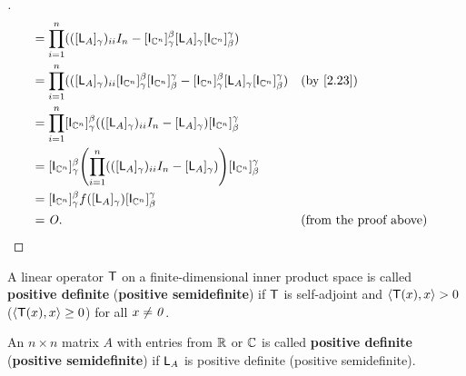 \begin{proof}[]
\begin{align*}
         & = \prod_{i = 1}^n (([\L_A]_{\gamma})_{i i} I_n - [\IT[\C^n]]_{\gamma}^{\beta} [\L_A]_{\gamma} [\IT[\C^n]]_{\beta}^{\gamma})                                                                                          \\
         & = \prod_{i = 1}^n (([\L_A]_{\gamma})_{i i} [\IT[\C^n]]_{\gamma}^{\beta} [\IT[\C^n]]_{\beta}^{\gamma} - [\IT[\C^n]]_{\gamma}^{\beta} [\L_A]_{\gamma} [\IT[\C^n]]_{\beta}^{\gamma}) &  & \text{(by \cref{2.23})}       \\
         & = \prod_{i = 1}^n [\IT[\C^n]]_{\gamma}^{\beta} (([\L_A]_{\gamma})_{i i} I_n - [\L_A]_{\gamma}) [\IT[\C^n]]_{\beta}^{\gamma}                                                                                          \\
         & = [\IT[\C^n]]_{\gamma}^{\beta} \pa{\prod_{i = 1}^n (([\L_A]_{\gamma})_{i i} I_n - [\L_A]_{\gamma})} [\IT[\C^n]]_{\beta}^{\gamma}                                                                                     \\
         & = [\IT[\C^n]]_{\gamma}^{\beta} f([\L_A]_{\gamma}) [\IT[\C^n]]_{\beta}^{\gamma}                                                                                                                                       \\
         & = \zm.                                                                                                                                                                            &  & \text{(from the proof above)}
  \end{align*}
\end{proof}

\begin{defn}\label{6.4.11}
  A linear operator \(\mathsf{T}\) on a finite-dimensional inner product space is called \textbf{positive definite} (\textbf{positive semidefinite}) if \(\mathsf{T}\) is self-adjoint and \(\left\langle\mathsf{T}(x), x\right\rangle > 0\) (\(\left\langle\mathsf{T}(x), x\right\rangle \geq 0\)) for all \(x \neq \mathit{0}\).

  An \(n \times n\) matrix \(A\) with entries from \(\mathbb{R}\) or \(\mathbb{C}\) is called \textbf{positive definite} (\textbf{positive semidefinite}) if \(\mathsf{L}_A\) is positive definite (positive semidefinite).
\end{defn}

